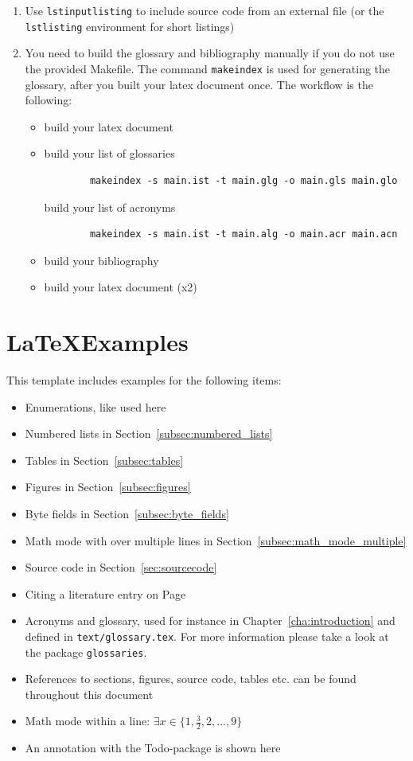 \begin{enumerate}
	\item Use \texttt{lstinputlisting} to include source code from an external file (or the \texttt{lstlisting} environment for short listings)
	\item You need to build the glossary and bibliography manually if you do not use the provided Makefile.
	The command \texttt{makeindex} is used for generating the glossary, after you built your latex document once.
	The workflow is the following:
	\begin{itemize}
	 \item build your latex document
	 \item build your list of glossaries 
        \begin{verbatim}
        makeindex -s main.ist -t main.glg -o main.gls main.glo
        \end{verbatim}
        build your list of acronyms
        \begin{verbatim}
        makeindex -s main.ist -t main.alg -o main.acr main.acn
        \end{verbatim}
    \item build your bibliography
    \item build your latex document (x2)
	\end{itemize}
\end{enumerate}

\section{\LaTeX Examples}

This template includes examples for the following items:

\begin{itemize}
    \item Enumerations, like used here
	\item Numbered lists in Section~\ref{subsec:numbered_lists}
	\item Tables in Section~\ref{subsec:tables}
	\item Figures in Section~\ref{subsec:figures}
    \item Byte fields in Section~\ref{subsec:byte_fields}
	\item Math mode with over multiple lines in Section~\ref{subsec:math_mode_multiple}
	\item Source code in Section~\ref{sec:sourcecode}
	\item Citing a literature entry on Page~\pageref{cha:introduction}
	\item Acronyms and glossary, used for instance in Chapter~\ref{cha:introduction} and defined in \texttt{text/glossary.tex}.
	For more information please take a look at the package \texttt{glossaries}.
	\item References to sections, figures, source code, tables etc. can be found throughout this document
	\item Math mode within a line: $\exists x \in \{1,\frac{3}{2},2,\ldots,9\}$
	\item An annotation with the Todo-package  is shown here
\end{itemize}


